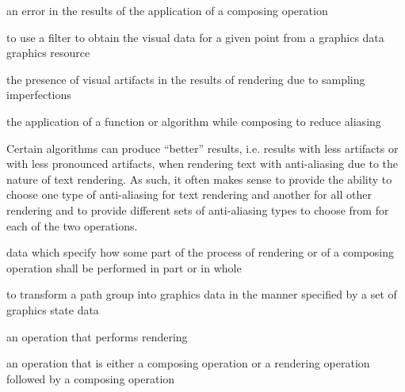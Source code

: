 %
an error in the results of the application of a composing operation 

%
to use a filter to obtain the visual data for a given point from a graphics data graphics resource

%
the presence of visual artifacts in the results of rendering due to 
sampling imperfections

%
the application of a function or algorithm while composing to 
reduce aliasing
\begin{note}
Certain algorithms can produce ``better'' results, i.e. results with less artifacts or with less pronounced artifacts, when rendering text with anti-aliasing due to the nature of text rendering. As such, it often makes sense to provide the ability to choose one type of anti-aliasing for text rendering and another for all other rendering and to provide different sets of anti-aliasing types to choose from for each of the two operations.
\end{note}

%
data which specify how some part of the process of rendering or of a composing operation shall be performed in part or in whole

%
to transform a path group into graphics data in the manner specified by a set of graphics state data

%
an operation that performs rendering

%
an operation that is either a composing operation or a rendering operation followed by a composing operation

